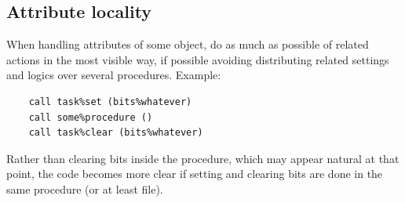 \documentclass[paper=a4,fontsize=11pt]{scrartcl}
\numberwithin{equation}{section}		%
\numberwithin{figure}{section}			%
\numberwithin{table}{section}				%
\newcommand{\codecolor}{\color{Blue}}
\begin{document}
\subsection{Attribute locality}
When handling attributes of some object, do as much as possible of related actions in the most visible way, if possible avoiding distributing related settings and logics over several procedures.  Example:
{\codecolor\small\begin{verbatim}
    call task%set (bits%whatever)
    call some%procedure ()
    call task%clear (bits%whatever)
\end{verbatim}}
Rather than clearing bits inside the procedure, which may appear natural at that point, the code becomes more clear if setting and clearing bits are done in the same procedure (or at least file).



\end{document}
